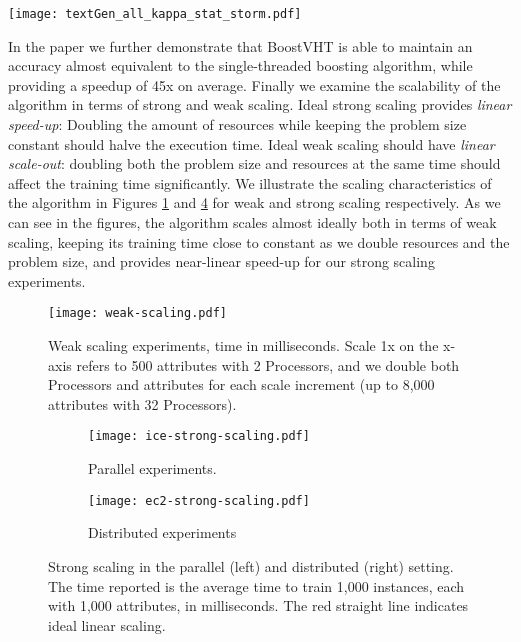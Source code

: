 \begin{figure*}
	\centering
	\texttt{[image: textGen\_all\_kappa\_stat\_storm.pdf]}
	\caption{Kappa statistic (accuracy) as a function of arriving instances over time for text generator datasets with
		an increasing number of attributes.}
	\label{fig:boostvht-textgen-accuracy}
\end{figure*}

In the paper we further demonstrate that BoostVHT is able to maintain an accuracy almost equivalent to
the single-threaded boosting algorithm, while providing a speedup of 45x on average.
Finally we examine the scalability of the algorithm in terms of strong and weak scaling.
Ideal strong scaling provides \emph{linear speed-up}: Doubling the amount of resources
while keeping the problem size constant should halve the execution time.
Ideal weak scaling should have \emph{linear scale-out}: doubling both the problem size
and resources at the same time should affect the training time significantly.
We illustrate the scaling characteristics of the algorithm in Figures
\ref{fig:weak-scaling} and \ref{fig:strong-scaling} for weak and strong
scaling respectively. As we can see in the figures, the algorithm scales
almost ideally both in terms of weak scaling, keeping its training time
close to constant as we double resources and the problem size, and provides
near-linear speed-up for our strong scaling experiments.

\begin{figure}
	\centering
	\texttt{[image: weak-scaling.pdf]}
	\caption{Weak scaling experiments, time in milliseconds. Scale 1x on the x-axis refers to 500 attributes with 2 Processors, and we double both Processors and attributes for each scale increment (up to 8,000 attributes with 32 Processors).}
	\label{fig:weak-scaling}
\end{figure}

\begin{figure}
	\centering
	\begin{subfigure}[t]{0.5\textwidth}
		\centering
		\texttt{[image: ice-strong-scaling.pdf]}
		\caption{Parallel experiments.}
		\label{fig:strong-parallel}
	\end{subfigure}%
	\begin{subfigure}[t]{0.5\textwidth}
		\centering
		\texttt{[image: ec2-strong-scaling.pdf]}
		\caption{Distributed experiments}
		\label{fig:strong-distributed}
	\end{subfigure}
	\caption{Strong scaling in the parallel (left) and distributed (right) setting. The
		time reported is the average time to train 1,000 instances, each with 1,000 attributes, in milliseconds. The red straight line indicates ideal linear scaling.}
	\label{fig:strong-scaling}
\end{figure}